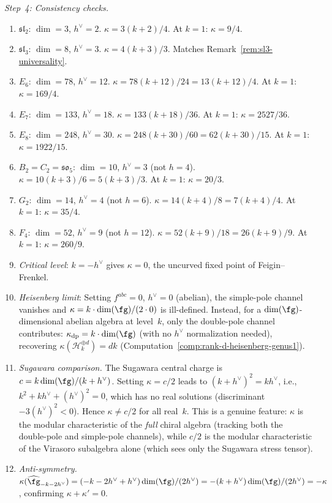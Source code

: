 \begin{computation}[First-principles derivation of
$\kappa(\widehat{\fg}_k) = \dim(\fg)(k+h^\vee)/(2h^\vee)$]
\emph{Step~4: Consistency checks.}
\begin{enumerate}[label=(\roman*)]
\item \emph{$\mathfrak{sl}_2$}: $\dim = 3$, $h^\vee = 2$.
$\kappa = 3(k+2)/4$. At $k=1$: $\kappa = 9/4$.
\item \emph{$\mathfrak{sl}_3$}: $\dim = 8$, $h^\vee = 3$.
$\kappa = 4(k+3)/3$. Matches
Remark~\ref{rem:sl3-universality}.
\item \emph{$E_6$}: $\dim = 78$, $h^\vee = 12$.
$\kappa = 78(k+12)/24 = 13(k+12)/4$. At $k=1$: $\kappa = 169/4$.
\item \emph{$E_7$}: $\dim = 133$, $h^\vee = 18$.
$\kappa = 133(k+18)/36$. At $k=1$: $\kappa = 2527/36$.
\item \emph{$E_8$}: $\dim = 248$, $h^\vee = 30$.
$\kappa = 248(k+30)/60 = 62(k+30)/15$. At $k=1$: $\kappa = 1922/15$.
\item \emph{$B_2 = C_2 = \mathfrak{so}_5$}: $\dim = 10$, $h^\vee = 3$ (not $h = 4$).
$\kappa = 10(k+3)/6 = 5(k+3)/3$. At $k=1$: $\kappa = 20/3$.
\item \emph{$G_2$}: $\dim = 14$, $h^\vee = 4$ (not $h = 6$).
$\kappa = 14(k+4)/8 = 7(k+4)/4$. At $k=1$: $\kappa = 35/4$.
\item \emph{$F_4$}: $\dim = 52$, $h^\vee = 9$ (not $h = 12$).
$\kappa = 52(k+9)/18 = 26(k+9)/9$. At $k=1$: $\kappa = 260/9$.
\item \emph{Critical level}: $k = -h^\vee$ gives
$\kappa = 0$, the uncurved fixed point of Feigin--Frenkel.
\item \emph{Heisenberg limit}: Setting $f^{abc} = 0$,
$h^\vee = 0$ (abelian), the simple-pole channel vanishes
and $\kappa = k\cdot\dim(\fg)/(2\cdot 0)$ is ill-defined.
Instead, for a $\dim(\fg)$-dimensional abelian algebra at
level~$k$, only the double-pole channel contributes:
$\kappa_{\mathrm{dp}} = k\cdot\dim(\fg)$ (with no $h^\vee$
normalization needed), recovering
$\kappa(\mathcal{H}_k^{\oplus d}) = dk$
(Computation~\ref{comp:rank-d-heisenberg-genus1}).
\item \emph{Sugawara comparison.}
The Sugawara central charge is
$c = k\dim(\fg)/(k+h^\vee)$.
Setting $\kappa = c/2$ leads to
$(k+h^\vee)^2 = kh^\vee$, i.e.,
$k^2 + kh^\vee + (h^\vee)^2 = 0$,
which has no real solutions (discriminant
$-3(h^\vee)^2 < 0$). Hence
$\kappa \neq c/2$ for all real~$k$.
This is a genuine feature:
$\kappa$ is the modular characteristic of the
\emph{full} chiral algebra (tracking both
the double-pole and simple-pole channels),
while $c/2$ is the modular characteristic
of the Virasoro subalgebra alone (which
sees only the Sugawara stress tensor).
\item \emph{Anti-symmetry.}
$\kappa(\widehat{\fg}_{-k-2h^\vee})
= (-k - 2h^\vee + h^\vee)\dim(\fg)/(2h^\vee)
= -(k + h^\vee)\dim(\fg)/(2h^\vee) = -\kappa$,
confirming $\kappa + \kappa' = 0$.
\end{enumerate}
\end{computation}

